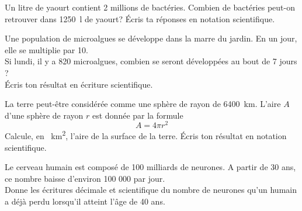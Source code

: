 \documentclass[../../syllabus_2.tex]{subfiles}
\begin{document}
\begin{exercise}
	Un litre de yaourt contient 2 millions de bactéries. Combien de bactéries peut-on retrouver dans \SI{1250}{l} de yaourt? Écris ta réponses en notation scientifique.

\end{exercise}

\begin{exercise}
	Une population de microalgues se développe dans la marre du jardin. En un jour, elle se multiplie par 10.\\
	Si lundi, il y a 820 microalgues, combien se seront développées au bout de 7 jours ? \\
	Écris ton résultat en écriture scientifique.
\end{exercise}

\begin{exercise}
	La terre peut-être considérée comme une sphère de rayon de \SI{6400}{km}. L'aire \(A\) d'une sphère de rayon \(r\) est donnée par la formule
	\begin{equation*}
		A=4\pi r^2
	\end{equation*}
	Calcule, en \SI{}{km^2}, l'aire de la surface de la terre. Écris ton résultat en notation scientifique.


\end{exercise}

\begin{exercise}
	Le cerveau humain est composé de 100 milliards de neurones. A partir de 30 ans, ce nombre baisse d'environ 100 000 par jour. \\
	Donne les écritures décimale et scientifique du nombre de neurones qu'un humain a déjà perdu lorsqu'il atteint l'âge de 40 ans.
\end{exercise}
\end{document}
